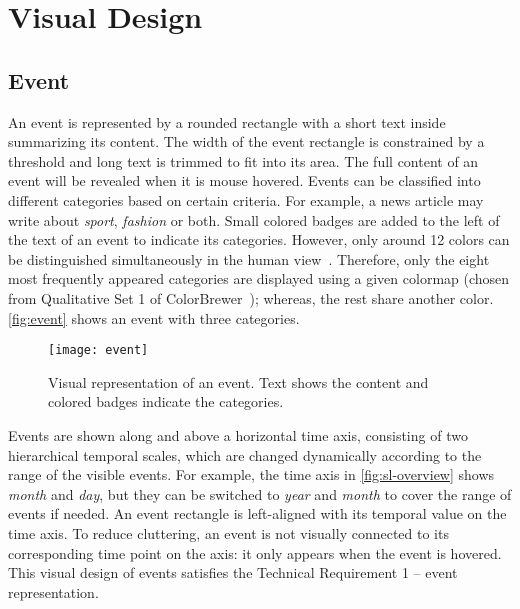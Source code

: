 \pagebreak
\section{Visual Design}

\subsection{Event}
An event is represented by a rounded rectangle with a short text inside summarizing its content. The width of the event rectangle is constrained by a threshold and long text is trimmed to fit into its area. The full content of an event will be revealed when it is mouse hovered. Events can be classified into different categories based on certain criteria. For example, a news article may write about \emph{sport}, \emph{fashion} or both. Small colored badges are added to the left of the text of an event to indicate its categories. However, only around 12 colors can be distinguished simultaneously in the human view~\cite{Munzner2014}. Therefore, only the eight most frequently appeared categories are displayed using a given colormap (chosen from Qualitative Set 1 of  ColorBrewer~\cite{Harrower2003}); whereas, the rest share another color. \autoref{fig:event} shows an event with three categories.

\begin{figure}[b]
\centering
\texttt{[image: event]}
\caption[Visual representation of an event]{Visual representation of an event. Text shows the content and colored badges indicate the categories.}
\label{fig:event}
\end{figure}

Events are shown along and above a horizontal time axis, consisting of two hierarchical temporal scales, which are changed dynamically according to the range of the visible events. For example, the time axis in \autoref{fig:sl-overview} shows \emph{month} and \emph{day}, but they can be switched to \emph{year} and \emph{month} to cover the range of events if needed. An event rectangle is left-aligned with its temporal value on the time axis. To reduce cluttering, an event is not visually connected to its corresponding time point on the axis: it only appears when the event is hovered. This visual design of events satisfies the Technical Requirement 1 -- event representation.

